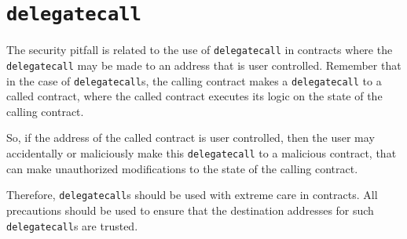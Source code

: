 \section{\texorpdfstring{\texttt{delegatecall}}{delegatecall}}\label{delegatecall}

The security pitfall is related to the use of \texttt{delegatecall} in
contracts where the \texttt{delegatecall} may be made to an address that
is user controlled. Remember that in the case of \texttt{delegatecall}s,
the calling contract makes a \texttt{delegatecall} to a called contract,
where the called contract executes its logic on the state of the calling
contract.

So, if the address of the called contract is user controlled, then the
user may accidentally or maliciously make this \texttt{delegatecall} to
a malicious contract, that can make unauthorized modifications to the
state of the calling contract.

Therefore, \texttt{delegatecall}s should be used with extreme care in
contracts. All precautions should be used to ensure that the destination
addresses for such \texttt{delegatecall}s are trusted.
